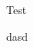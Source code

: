 \documentclass[a4paper,12pt]{article}
\begin{document}
Test


\begin{beispiel}{48} %
dasd
\end{beispiel}
\newpage

%
\end{document}
